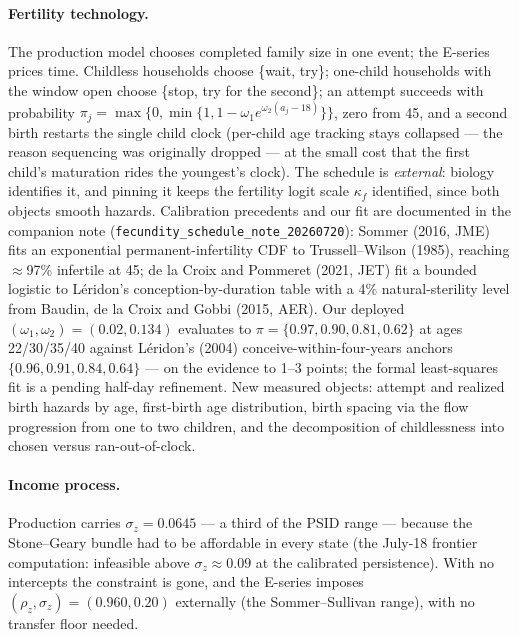 \documentclass[10pt]{article}
\begin{document}
\paragraph{Fertility technology.}
The production model chooses completed family size in one event; the
E-series prices time. Childless households choose \{wait, try\}; one-child
households with the window open choose \{stop, try for the second\}; an
attempt succeeds with probability $\pi_j = \max\{0,\min\{1,
1-\omega_1e^{\omega_2(a_j-18)}\}\}$, zero from 45, and a second birth
restarts the single child clock (per-child age tracking stays collapsed
--- the reason sequencing was originally dropped --- at the small cost
that the first child's maturation rides the youngest's clock). The
schedule is \emph{external}: biology identifies it, and pinning it keeps
the fertility logit scale $\kappa_f$ identified, since both objects
smooth hazards. Calibration precedents and our fit are documented in the
companion note (\texttt{fecundity\_schedule\_note\_20260720}): Sommer
(2016, JME) fits an exponential permanent-infertility CDF to
Trussell--Wilson (1985), reaching $\approx$97\% infertile at 45; de la
Croix and Pommeret (2021, JET) fit a bounded logistic to L\'eridon's
conception-by-duration table with a 4\% natural-sterility level from
Baudin, de la Croix and Gobbi (2015, AER). Our deployed
$(\omega_1,\omega_2)=(0.02,0.134)$ evaluates to $\pi=\{0.97, 0.90, 0.81,
0.62\}$ at ages 22/30/35/40 against L\'eridon's (2004)
conceive-within-four-years anchors $\{0.96, 0.91, 0.84, 0.64\}$ --- on
the evidence to 1--3 points; the formal least-squares fit is a pending
half-day refinement. New measured objects: attempt and realized birth
hazards by age, first-birth age distribution, birth spacing via the flow
progression from one to two children, and the decomposition of
childlessness into chosen versus ran-out-of-clock.

\paragraph{Income process.}
Production carries $\sigma_z=0.0645$ --- a third of the PSID range ---
because the Stone--Geary bundle had to be affordable in every state (the
July-18 frontier computation: infeasible above $\sigma_z\!\approx\!0.09$
at the calibrated persistence). With no intercepts the constraint is
gone, and the E-series imposes $(\rho_z,\sigma_z)=(0.960, 0.20)$
externally (the Sommer--Sullivan range), with no transfer floor needed.
\end{document}
